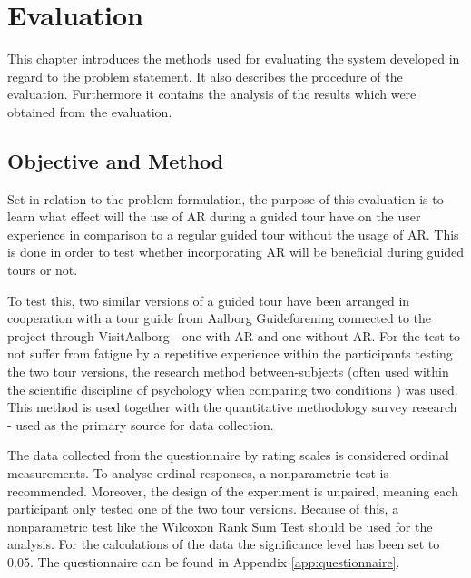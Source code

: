 \chapter{Evaluation}\label{ch:evaluation}
This chapter introduces the methods used for evaluating the system developed in regard to the problem statement. It also describes the procedure of the evaluation. Furthermore it contains the analysis of the results which were obtained from the evaluation.

\section{Objective and Method} 
Set in relation to the problem formulation, the purpose of this evaluation is to learn what effect will the use of AR during a guided tour have on the user experience in comparison to a regular guided tour without the usage of AR. This is done in order to test whether incorporating AR will be beneficial during guided tours or not. 

To test this, two similar versions of a guided tour have been arranged in cooperation with a tour guide from Aalborg Guideforening connected to the project through VisitAalborg - one with AR and one without AR. For the test to not suffer from fatigue by a repetitive experience within the participants testing the two tour versions, the research method between-subjects (often used within the scientific discipline of psychology when comparing two conditions \cite{Charness2012}) was used. This method is used together with the quantitative methodology survey research - used as the primary source for data collection.

The data collected from the questionnaire by rating scales is considered ordinal measurements. To analyse ordinal responses, a nonparametric test is recommended. Moreover, the design of the experiment is unpaired, meaning each participant only tested one of the two tour versions. Because of this, a nonparametric test like the Wilcoxon Rank Sum Test should be used for the analysis. For the calculations of the data the significance level has been set to 0.05. The questionnaire can be found in Appendix \ref{app:questionnaire}.


